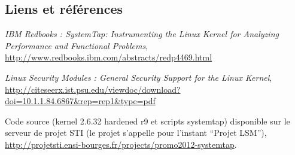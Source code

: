 \documentclass[pdftex,a4paper,titlepage,11pt,openright]{article}
\begin{document}

\subsection*{Liens et références}
\begin{thebibliography}{40}
 \textit{IBM Redbooks : SystemTap: Instrumenting the Linux Kernel for Analyzing Performance and Functional Problems}, \url{http://www.redbooks.ibm.com/abstracts/redp4469.html}

 \textit{Linux Security Modules : General Security Support for the Linux Kernel}, \url{http://citeseerx.ist.psu.edu/viewdoc/download?doi=10.1.1.84.6867&rep=rep1&type=pdf}

 Code source (kernel 2.6.32 hardened r9 et scripts systemtap) disponible sur le serveur de projet STI (le projet s'appelle pour l'instant ``Projet LSM''), \url{http://projetsti.ensi-bourges.fr/projects/promo2012-systemtap}.
\end{thebibliography}

\end{document}
